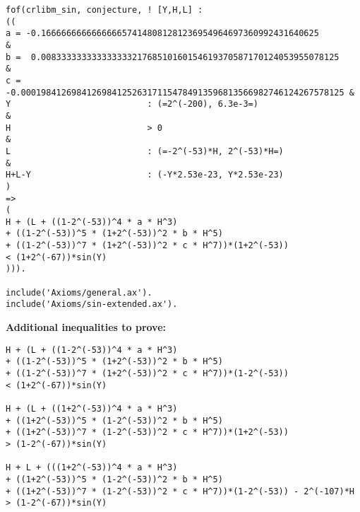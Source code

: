 \documentclass{fac}
\begin{document}
\begin{lstlisting}
fof(crlibm_sin, conjecture, ! [Y,H,L] : 
((
a = -0.1666666666666666574148081281236954964697360992431640625          &
b =  0.00833333333333333321768510160154619370587170124053955078125      &
c = -0.0001984126984126984125263171154784913596813566982746124267578125 &
Y                           : (=2^(-200), 6.3e-3=)                      &  
H                           > 0                                         &
L                           : (=-2^(-53)*H, 2^(-53)*H=)                 &
H+L-Y                       : (-Y*2.53e-23, Y*2.53e-23)                 
) 
=>
( 
H + (L + ((1-2^(-53))^4 * a * H^3) 
+ ((1-2^(-53))^5 * (1+2^(-53))^2 * b * H^5) 
+ ((1-2^(-53))^7 * (1+2^(-53))^2 * c * H^7))*(1+2^(-53)) 
< (1+2^(-67))*sin(Y)    
))).

include('Axioms/general.ax').
include('Axioms/sin-extended.ax').
\end{lstlisting}


\noindent\textbf{Additional inequalities to prove:}
\begin{lstlisting}
H + (L + ((1-2^(-53))^4 * a * H^3) 
+ ((1-2^(-53))^5 * (1+2^(-53))^2 * b * H^5) 
+ ((1-2^(-53))^7 * (1+2^(-53))^2 * c * H^7))*(1-2^(-53)) 
< (1+2^(-67))*sin(Y)    

H + (L + ((1+2^(-53))^4 * a * H^3) 
+ ((1+2^(-53))^5 * (1-2^(-53))^2 * b * H^5) 
+ ((1+2^(-53))^7 * (1-2^(-53))^2 * c * H^7))*(1+2^(-53)) 
> (1-2^(-67))*sin(Y) 

H + L + (((1+2^(-53))^4 * a * H^3) 
+ ((1+2^(-53))^5 * (1-2^(-53))^2 * b * H^5) 
+ ((1+2^(-53))^7 * (1-2^(-53))^2 * c * H^7))*(1-2^(-53)) - 2^(-107)*H 
> (1-2^(-67))*sin(Y) 
\end{lstlisting}
\end{document}
